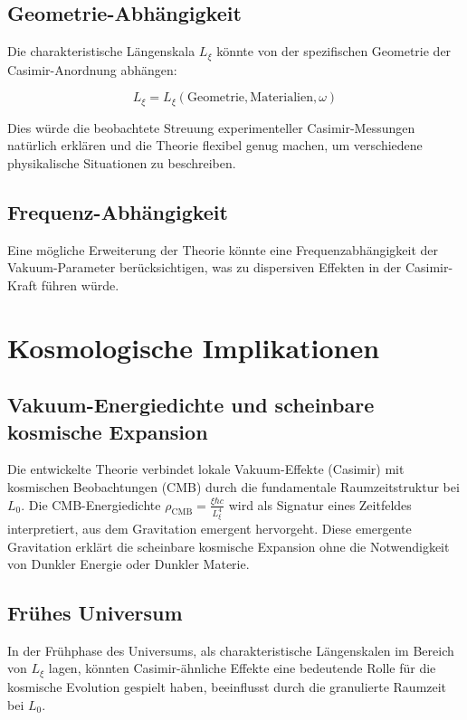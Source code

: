 \documentclass[12pt,a4paper]{article}
\begin{document}
	\subsection{Geometrie-Abhängigkeit}
	
	Die charakteristische Längenskala \( L_\xi \) könnte von der spezifischen Geometrie der Casimir-Anordnung abhängen:
	
	\begin{equation}
		L_\xi = L_\xi(\text{Geometrie}, \text{Materialien}, \omega) \label{eq:Lxi_dependencies}
	\end{equation}
	
	Dies würde die beobachtete Streuung experimenteller Casimir-Messungen natürlich erklären und die Theorie flexibel genug machen, um verschiedene physikalische Situationen zu beschreiben.
	
	\subsection{Frequenz-Abhängigkeit}
	
	Eine mögliche Erweiterung der Theorie könnte eine Frequenzabhängigkeit der Vakuum-Parameter berücksichtigen, was zu dispersiven Effekten in der Casimir-Kraft führen würde.
	
	\section{Kosmologische Implikationen}
	
	\subsection{Vakuum-Energiedichte und scheinbare kosmische Expansion}
	
	Die entwickelte Theorie verbindet lokale Vakuum-Effekte (Casimir) mit kosmischen Beobachtungen (CMB) durch die fundamentale Raumzeitstruktur bei \( L_0 \). Die CMB-Energiedichte \( \rho_{\text{CMB}} = \frac{\xi \hbar c}{L_\xi^4} \) wird als Signatur eines Zeitfeldes interpretiert, aus dem Gravitation emergent hervorgeht. Diese emergente Gravitation erklärt die scheinbare kosmische Expansion ohne die Notwendigkeit von Dunkler Energie oder Dunkler Materie.
	
	\subsection{Frühes Universum}
	
	In der Frühphase des Universums, als charakteristische Längenskalen im Bereich von \( L_\xi \) lagen, könnten Casimir-ähnliche Effekte eine bedeutende Rolle für die kosmische Evolution gespielt haben, beeinflusst durch die granulierte Raumzeit bei \( L_0 \).
	
\end{document}
